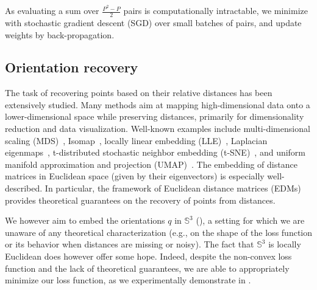 As evaluating a sum over $\frac{P^2-P}{2}$ pairs is computationally intractable,
we minimize  with stochastic gradient descent (SGD) over small batches of pairs, and update weights by back-propagation.

\subsection{Orientation recovery}\label{sec:method:orientation-recovery}

The task of recovering points based on their relative distances has been extensively studied.
Many methods aim at mapping high-dimensional data onto a lower-dimensional space while preserving distances, primarily for dimensionality reduction and data visualization.
Well-known examples include multi-dimensional scaling (MDS)~\cite{cox2008mds}, Isomap~\cite{tenenbaum2000isomap}, locally linear embedding (LLE)~\cite{roweis2000lle}, Laplacian eigenmaps~\cite{belkin2003laplacian}, t-distributed stochastic neighbor embedding (t-SNE)~\cite{maaten2008tsne}, and uniform manifold approximation and projection (UMAP)~\cite{mcinnes2018umap}.
The embedding of distance matrices in Euclidean space (given by their eigenvectors) is especially well-described.
In particular, the framework of Euclidean distance matrices (EDMs)~\cite{dokmanic2015edm} provides theoretical guarantees on the recovery of points from distances.

We however aim to embed the orientations $q$ in $\mathbb{S}^3$ (), a setting for which we are unaware of any theoretical characterization (e.g., on the shape of the loss function or its behavior when distances are missing or noisy).
The fact that $\mathbb{S}^3$ is locally Euclidean does however offer some hope. %
Indeed, despite the non-convex loss function and the lack of theoretical guarantees, we are able to appropriately minimize our loss function, as we experimentally demonstrate in .

